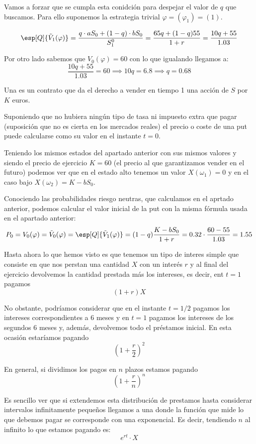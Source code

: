 \begin{problem}[1]
Vamos a forzar que se cumpla esta conidción para despejar el valor de $q$ que buscamos. Para ello suponemos la estrategia trivial $\varphi=(\varphi_1) =(1)$.

\[\esp[Q]{\tilde{V}_1(\varphi)} = \frac{q\cdot aS_0 + (1-q)\cdot bS_0}{S_1^0} = \frac{65q + (1-q)55}{1+r} = \frac{10q+55}{1.03}\]

Por otro lado sabemos que $V_0(\varphi) = 60$ con lo que igualando llegamos a:
\[\frac{10q+55}{1.03} = 60 \implies 10q = 6.8 \implies q = 0.68 \]

\spart

Una  es un contrato que da el derecho a vender en tiempo 1 una acción de $S$ por $K$ euros.

Suponiendo que no hubiera ningún tipo de tasa ni impuesto extra que pagar (suposición que no es cierta en los mercados reales) el precio o coste de una put puede calcularse como su valor en el instante $t=0$.

Teniendo los mismos estados del apartado anterior con sus mismos valores y siendo el precio de ejercicio $K=60$ \texteuro (el precio al que garantizamos vender en el futuro) podemos ver que en el estado alto tenemos un valor $X(ω_1)=0$ y en el caso bajo $X(ω_2)=K-bS_0$.

Conociendo las probabilidades riesgo neutras, que calculamos en el aprtado anterior, podemos calcular el valor inicial de la put con la misma fórmula usada en el apartado anterior:
\[P_0 = V_0(\varphi) = \tilde{V}_0(\varphi) = \esp[Q]{\tilde{V}_1(\varphi)} = (1-q) \frac{K-bS_0}{1+r} = 0.32 \cdot \frac{60-55}{1.03}=1.55\]

\spart

Hasta ahora lo que hemos visto es que tenemos un tipo de interes simple que consiste en que nos perstan una cantidad $X$ con un interés $r$ y al final del ejercicio devolvemos la cantidad prestada más los intereses, es decir, ent $t=1$ pagamos
\[(1+r)X\]

No obstante, podríamos considerar que en el instante $t=1/2$ pagamos los intereses correspondientes a 6 meses y en $t=1$ pagamos los intereses de los segundos 6 meses y, además, devolvemos todo el préstamos inicial. En esta ocasión estaríamos pagando
\[\left(1+\frac{r}{2}\right)^2\]

En general, si dividimos los pagos en $n$ plazos estamos pagando
\[\left( 1 + \frac{r}{n} \right)^n\]

Es sencillo ver que si extendemos esta distribución de prestamos hasta considerar intervalos infinitamente pequeños llegamos a una  donde la función que mide lo que debemos pagar se corresponde con una exponencial. Es decir, tendiendo $n$ al infinito lo que estamos pagando es:
\[e^{rt}\cdot X\]


\end{problem}
